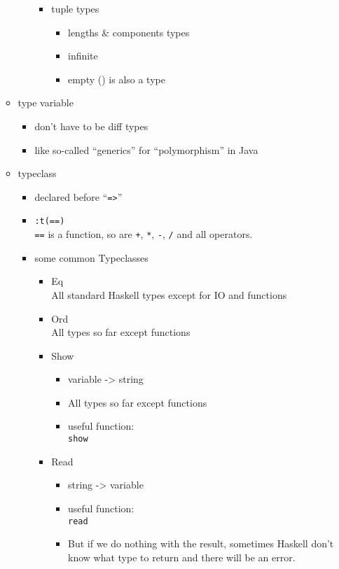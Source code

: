 \documentclass[a4paper,10pt]{article}
\begin{document}
\begin{enumerate}
\begin{itemize}
\begin{itemize}
\begin{itemize}
     \item tuple types
     \begin{itemize}
      \item lengths \& components types
      \item infinite
      \item empty () is also a type
     \end{itemize}
    \end{itemize}
   \end{itemize}
   \item type variable
   \begin{itemize}
    \item don't have to be diff types
    \item like so-called ``generics'' for ``polymorphism'' in Java
   \end{itemize}
   \item typeclass
   \begin{itemize}
    \item declared before ``\texttt{=>}''
    \item \texttt{:t(==)}
    \\\texttt{==} is a function, so are \texttt{+}, \texttt{*}, \texttt{-}, \texttt{/} and all operators.
    \item some common Typeclasses
    \begin{itemize}
     \item Eq
     \\ All standard Haskell types except for IO and functions
     \item Ord
     \\ All types so far except functions
     \item Show
     \begin{itemize}
      \item variable -> string
      \item All types so far except functions 
      \item useful function:
      \\\texttt{show}
     \end{itemize}
     \item Read
     \begin{itemize}
      \item string -> variable
      \item useful function:
      \\\texttt{read}
      \item But if we do nothing with the result, sometimes Haskell don't know what type to return and there will be an error.

\end{itemize}
\end{itemize}
\end{itemize}
\end{itemize}
\end{enumerate}
\end{document}
